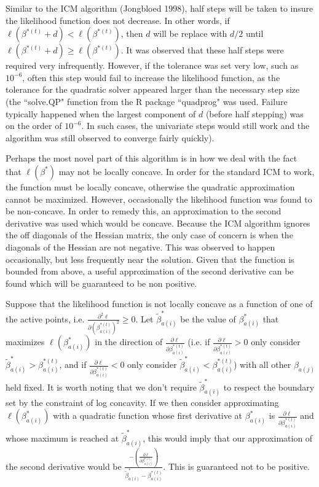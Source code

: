 \documentclass[12pt]{article}
\numberwithin{equation}{section}
\begin{document}
	Similar to the ICM algorithm (Jongbloed 1998), half steps will be taken to insure the likelihood function does not decrease. In other words, if $\ell ( \beta^{*(t)} + d ) < \ell ( \beta^{*(t)}  ) $, then $d$ will be replace with $d/2$ until $\ell ( \beta^{*(t)} + d ) \geq \ell ( \beta^{*(t)} )$. It was observed that these half steps were required very infrequently. However, if the tolerance was set very low, such as $10^{-6}$, often this step would fail to increase the likelihood function, as the tolerance for the quadratic solver appeared larger than the necessary step size (the ``solve.QP" function from the R package ``quadprog" was used. Failure typically happened when the largest component of $d$ (before half stepping) was on the order of $10^{-6}$. In such cases, the univariate steps would still work and the algorithm was still observed to converge fairly quickly). 
	
	Perhaps the most novel part of this algorithm is in how we deal with the fact that $\ell(\beta^*)$ may not be locally concave. In order for the standard ICM to work, the function must be locally concave, otherwise the quadratic approximation cannot be maximized. However, occasionally the likelihood function was found to be non-concave. In order to remedy this, an approximation to the second derivative was used which would be concave. Because the ICM algorithm ignores the off diagonals of the Hessian matrix, the only case of concern is when the diagonals of the Hessian are not negative. This was observed to happen occasionally, but less frequently near the solution. Given that the function is bounded from above, a useful approximation of the second derivative can be found which will be guaranteed to be non positive. 
	
	Suppose that the likelihood function is not locally concave as a function of one of the active points, i.e. $ \frac{\partial^2 \ell} { \partial {(\beta^{*(t)}_{a(i)})}^2} \geq 0$. Let $\tilde \beta^*_{a(i)}$ be the value of $\beta^*_{a(i)}$ that maximizes $\ell(\beta^*_{a(i)})$ in the direction of $ \frac{\partial \ell} {\partial \beta^{*(t)}_{a(i)}} $ (i.e. if $  \frac{\partial \ell} {\partial \beta^{*(t)}_{a(i)}} > 0$ only consider  $\tilde \beta^*_{a(i)} > \beta^{*(t)}_{a(i)}$, and if $  \frac{\partial \ell} {\partial \beta^{*(t)}_{a(i)}}< 0 $ only consider $\tilde \beta^*_{a(i)} < \beta^{*(t)}_{a(i)}$)  with all other $\beta_{a(j)}$ held fixed. It is worth noting that we don't require $\tilde \beta^*_{a(i)}$ to respect the boundary set by the constraint of log concavity. If we then consider approximating $\ell(\beta^*_{a(i)})$ with a quadratic function whose first derivative at $\beta^*_{a(i)}$ is $  \frac{\partial \ell} {\partial \beta^{*(t)}_{a(i)}} $ and whose maximum is reached at $\tilde \beta^*_{a(i)}$, this would imply that our approximation of the second derivative would be $\frac{- \left( \frac{\partial \ell} {\partial \beta^{*(t)}_{a(i)} }  \right) } {\tilde \beta^*_{a(i)} -\beta^{*(t)}_{a(i)}}$. This is guaranteed not to be positive.
	
\end{document}
